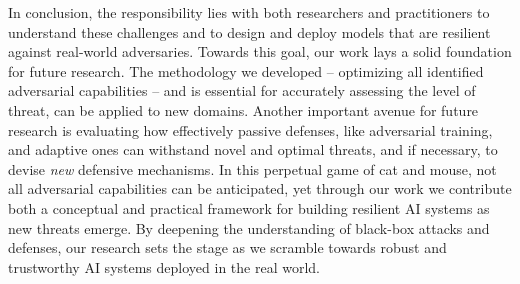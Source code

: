 In conclusion, the responsibility lies with both researchers and practitioners to understand these challenges and to design and deploy models that are resilient against real-world adversaries.
Towards this goal, our work lays a solid foundation for future research.
The methodology we developed -- optimizing all identified adversarial capabilities -- and is essential for accurately assessing the level of threat, can be applied to new domains.
Another important avenue for future research is evaluating how effectively passive defenses, like adversarial training, and adaptive ones can withstand novel and optimal threats, and if necessary, to devise \textit{new} defensive mechanisms.
In this perpetual game of cat and mouse, not all adversarial capabilities can be anticipated, yet through our work we contribute both a conceptual and practical framework for building resilient AI systems as new threats emerge. 
By deepening the understanding of black-box attacks and defenses, our research sets the stage as we scramble towards robust and trustworthy \gls{AI} systems deployed in the real world.


\cleardoublepage